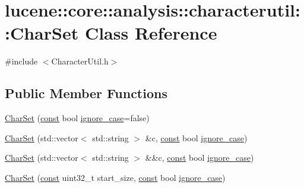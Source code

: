 \hypertarget{classlucene_1_1core_1_1analysis_1_1characterutil_1_1CharSet}{}\section{lucene\+:\+:core\+:\+:analysis\+:\+:characterutil\+:\+:Char\+Set Class Reference}
\label{classlucene_1_1core_1_1analysis_1_1characterutil_1_1CharSet}


{\ttfamily \#include $<$Character\+Util.\+h$>$}

\subsection*{Public Member Functions}
\begin{DoxyCompactItemize}
\item 
\mbox{\hyperlink{classlucene_1_1core_1_1analysis_1_1characterutil_1_1CharSet_a983251c2914f0fbbb46cb6e73864474f}{Char\+Set}} (\mbox{\hyperlink{ZlibCrc32_8h_a2c212835823e3c54a8ab6d95c652660e}{const}} bool \mbox{\hyperlink{classlucene_1_1core_1_1analysis_1_1characterutil_1_1CharSet_a02b6c12938776a5c94003f6ebe784f17}{ignore\+\_\+case}}=false)
\item 
\mbox{\hyperlink{classlucene_1_1core_1_1analysis_1_1characterutil_1_1CharSet_a86ec41a435119d58269b961894bcb88c}{Char\+Set}} (std\+::vector$<$ std\+::string $>$ \&c, \mbox{\hyperlink{ZlibCrc32_8h_a2c212835823e3c54a8ab6d95c652660e}{const}} bool \mbox{\hyperlink{classlucene_1_1core_1_1analysis_1_1characterutil_1_1CharSet_a02b6c12938776a5c94003f6ebe784f17}{ignore\+\_\+case}})
\item 
\mbox{\hyperlink{classlucene_1_1core_1_1analysis_1_1characterutil_1_1CharSet_a124a55e602398b3404c0eb99f9f7ed87}{Char\+Set}} (std\+::vector$<$ std\+::string $>$ \&\&c, \mbox{\hyperlink{ZlibCrc32_8h_a2c212835823e3c54a8ab6d95c652660e}{const}} bool \mbox{\hyperlink{classlucene_1_1core_1_1analysis_1_1characterutil_1_1CharSet_a02b6c12938776a5c94003f6ebe784f17}{ignore\+\_\+case}})
\item 
\mbox{\hyperlink{classlucene_1_1core_1_1analysis_1_1characterutil_1_1CharSet_aa0426762b8a93f85d8b6e5486be0cb66}{Char\+Set}} (\mbox{\hyperlink{ZlibCrc32_8h_a2c212835823e3c54a8ab6d95c652660e}{const}} uint32\+\_\+t start\+\_\+size, \mbox{\hyperlink{ZlibCrc32_8h_a2c212835823e3c54a8ab6d95c652660e}{const}} bool \mbox{\hyperlink{classlucene_1_1core_1_1analysis_1_1characterutil_1_1CharSet_a02b6c12938776a5c94003f6ebe784f17}{ignore\+\_\+case}})

\end{DoxyCompactItemize}
